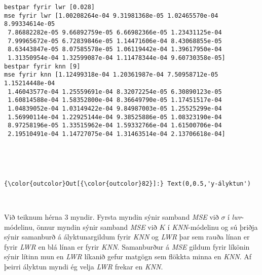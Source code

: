 \documentclass[11pt]{article}
\begin{document}
    \begin{Verbatim}[commandchars=\\\{\}]
bestpar fyrir lwr [0.028]
mse fyrir lwr [1.00208264e-04 9.31981368e-05 1.02465570e-04 8.99334614e-05
 7.86882282e-05 9.66892759e-05 6.66982366e-05 1.23431125e-04
 7.99965672e-05 6.72839846e-05 1.14471606e-04 8.43068855e-05
 8.63443847e-05 8.07585578e-05 1.06119442e-04 1.39617950e-04
 1.31350954e-04 1.32599087e-04 1.11478344e-04 9.60730358e-05]
bestpar fyrir knn [9]
mse fyrir knn [1.12499318e-04 1.20361987e-04 7.50958712e-05 1.15214448e-04
 1.46043577e-04 1.25559691e-04 8.32072254e-05 6.30890123e-05
 1.60814588e-04 1.58352800e-04 8.36649790e-05 1.17451517e-04
 1.04839052e-04 1.03149422e-04 9.84987003e-05 1.25525299e-04
 1.56990114e-04 1.22925144e-04 9.38525886e-05 1.08323190e-04
 8.97258196e-05 1.33515962e-04 1.59332766e-04 1.61500706e-04
 2.19510491e-04 1.14727075e-04 1.31463514e-04 2.13706618e-04]

    \end{Verbatim}

    \begin{center}
    \end{center}
    { \hspace*{\fill} \\}
    
    \begin{center}
    \end{center}
    { \hspace*{\fill} \\}
    
\begin{Verbatim}[commandchars=\\\{\}]
{\color{outcolor}Out[{\color{outcolor}82}]:} Text(0,0.5,'y-ályktun')
\end{Verbatim}
            
    \begin{center}
    \end{center}
    { \hspace*{\fill} \\}
    
    Við teiknum hérna 3 myndir. Fyrsta myndin sýnir samband \emph{MSE} við
\(\sigma\) í \emph{lwr}-módelinu, önnur myndin sýnir samband \emph{MSE}
við \(K\) í \emph{KNN}-módelinu og sú þriðja sýnir samanburð á
ályktunargildum fyrir \emph{KNN} og \emph{LWR} þar sem rauða línan er
fyrir \emph{LWR} en blá línan er fyrir \emph{KNN}. Samanburður á
\emph{MSE} gildum fyrir líkönin sýnir lítinn mun en \emph{LWR} líkanið
gefur matgögn sem flökkta minna en \emph{KNN}. Af þeirri ályktun myndi
ég velja \emph{LWR} frekar en \emph{KNN}.
\end{document}
